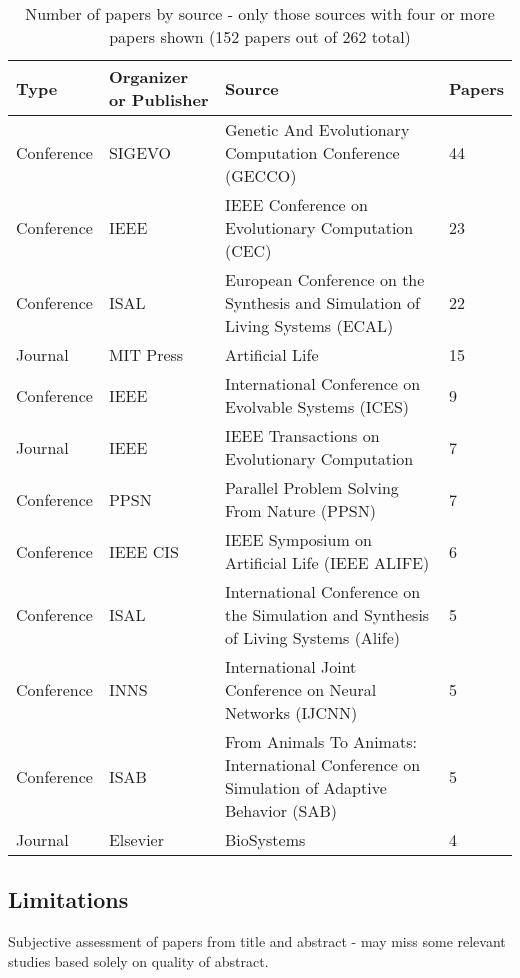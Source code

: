 \begin{table}
	\footnotesize
	\begin{center}
		\begin{tabular}{@{}llp{8cm}l@{}}
			\toprule
			Type & Organizer or Publisher & Source & Papers\\
			\midrule
			Conference&		SIGEVO & 		Genetic And Evolutionary Computation Conference (GECCO) & 							44\\
			Conference&		IEEE & 			IEEE Conference on Evolutionary Computation (CEC) &									23\\
			Conference&		ISAL & 			European Conference on the Synthesis and Simulation of Living Systems (ECAL) &		22\\
			Journal&		MIT Press & 	Artificial Life &																	15\\
			Conference&		IEEE & 			International Conference on Evolvable Systems (ICES) &								9\\
			Journal&		IEEE &			IEEE Transactions on Evolutionary Computation &										7\\
			Conference&		PPSN & 			Parallel Problem Solving From Nature (PPSN) &										7\\
			Conference&		IEEE CIS & 		IEEE Symposium on Artificial Life (IEEE ALIFE) &									6\\
			Conference&		ISAL &			International Conference on the Simulation and Synthesis of Living Systems (Alife)& 5\\
			Conference&		INNS&			International Joint Conference on Neural Networks (IJCNN) & 						5\\
			Conference&		ISAB & 			From Animals To Animats: International Conference on Simulation of Adaptive Behavior (SAB) & 5\\
			Journal&		Elsevier &		BioSystems & 4\\
			\bottomrule
		\end{tabular}
	\end{center}
	\caption{Number of papers by source - only those sources with four or more papers shown (152 papers out of 262 total)\label{tbl:publicationsources}}
\end{table}

\subsection{Limitations}
Subjective assessment of papers from title and abstract - may miss some relevant studies based solely on quality of abstract.


